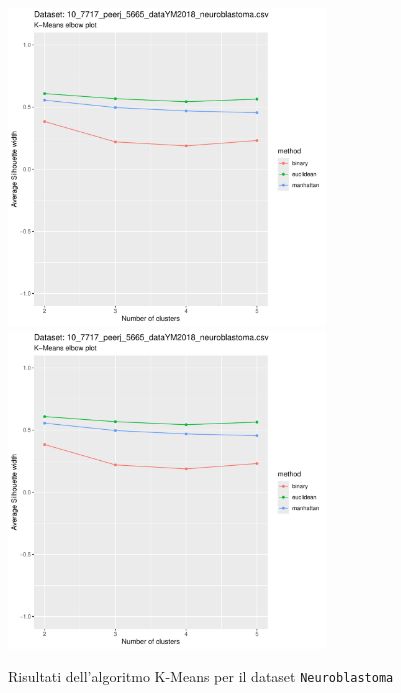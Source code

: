 \documentclass[a4paper, 12pt]{report}
\begin{document}
			\begin{figure}[H]
				\centering
				\includegraphics[width = 0.75\textwidth, height = 0.45\textheight, page = 1]{
					results/results_Neuroblastoma.csv.pdf
				}
				\includegraphics[width = 0.75\textwidth, height = 0.45\textheight, page = 2]{
					results/results_Neuroblastoma.csv.pdf
				}
				\caption{Risultati dell'algoritmo K-Means per il dataset
				\texttt{Neuroblastoma}}
				\label{fig:kmeans3}
			\end{figure}
\end{document}
